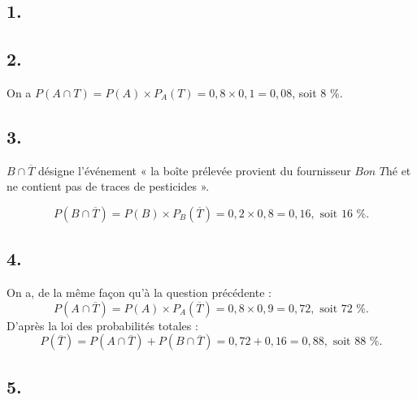 \subsection*{1.}

\begin{center}
\end{center}

\subsection*{2.}

On a \( P(A \cap T) = P(A) \times P_A(T) = 0{,}8 \times 0{,}1 = 0{,}08 \), soit 8 \%.

\subsection*{3.}

\( B \cap \overline{T} \) désigne l'événement « la boîte prélevée provient du fournisseur \(\textit{Bon Thé}\) et ne contient pas de traces de pesticides ».

\[
P(B \cap \overline{T}) = P(B) \times P_B(\overline{T}) = 0{,}2 \times 0{,}8 = 0{,}16, \text{ soit 16 \%}.
\]

\subsection*{4.}

On a, de la même façon qu'à la question précédente :
\[
P(A \cap \overline{T}) = P(A) \times P_A(\overline{T}) = 0{,}8 \times 0{,}9 = 0{,}72, \text{ soit 72 \%}.
\]
D'après la loi des probabilités totales :
\[
P(\overline{T}) = P(A \cap \overline{T}) + P(B \cap \overline{T}) = 0{,}72 + 0{,}16 = 0{,}88, \text{ soit 88 \%}.
\]

\subsection*{5.}

